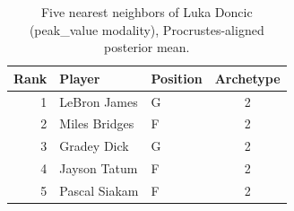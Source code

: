 \begin{table}[htbp]
  \centering\small
  \begin{tabular}{rllc}
    \toprule
    Rank & Player & Position & Archetype \\
    \midrule
    1 & LeBron James & G & 2 \\
    2 & Miles Bridges & F & 2 \\
    3 & Gradey Dick & G & 2 \\
    4 & Jayson Tatum & F & 2 \\
    5 & Pascal Siakam & F & 2 \\
    \bottomrule
  \end{tabular}
  \caption{Five nearest neighbors of Luka Doncic (peak_value modality), Procrustes-aligned posterior mean.}
  \label{tab:Luka_Doncic_neighbors_peak_value}
\end{table}

